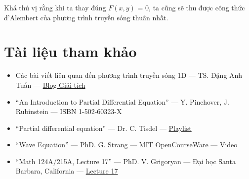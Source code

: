 \documentclass[a4paper]{article}
\begin{document}
Khá thú vị rằng khi ta thay đúng $F(x, y)$ = 0, ta cũng sẽ thu được công thức d'Alembert của phương trình truyền sóng thuần nhất.

\section{Tài liệu tham khảo}
\begin{itemize}
    \item Các bài viết liên quan đến phương trình truyền sóng 1D --- TS. Đặng Anh Tuấn ---  \href{https://bomongiaitich.wordpress.com}{Blog Giải tích}
    \item ``An Introduction to Partial Differential Equation'' --- Y. Pinchover, J. Rubinstein --- ISBN 1-502-60323-X
    \item ``Partial differential equation'' --- Dr. C. Tisdel --- \href{https://www.youtube.com/playlist?list=PLGCj8f6sgswntUil8yzohR_qazOfYZCg_}{Playlist}
    \item ``Wave Equation'' --- PhD. G. Strang --- MIT OpenCourseWare --- \href{https://youtu.be/9TQCKWWAVjM}{Video}
    \item ``Math 124A/215A, Lecture 17'' --- PhD. V. Grigoryan --- Đại học Santa Barbara, California --- \href{http://web.math.ucsb.edu/~grigoryan/124A/lecs/lec17.pdf}{Lecture 17}
\end{itemize}
\end{document}
